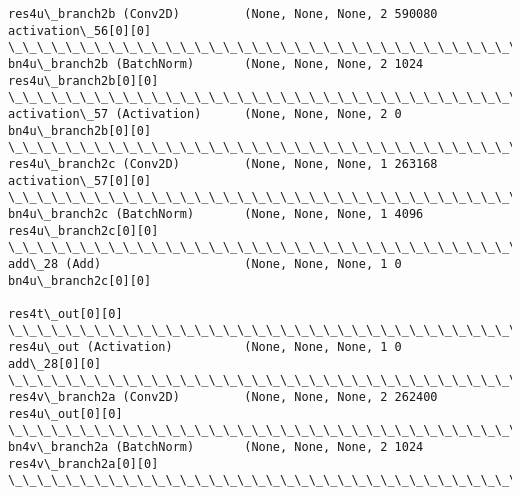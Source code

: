 \documentclass[11pt]{article}
\begin{document}
\begin{Verbatim}[commandchars=\\\{\}]
res4u\_branch2b (Conv2D)         (None, None, None, 2 590080      activation\_56[0][0]              
\_\_\_\_\_\_\_\_\_\_\_\_\_\_\_\_\_\_\_\_\_\_\_\_\_\_\_\_\_\_\_\_\_\_\_\_\_\_\_\_\_\_\_\_\_\_\_\_\_\_\_\_\_\_\_\_\_\_\_\_\_\_\_\_\_\_\_\_\_\_\_\_\_\_\_\_\_\_\_\_\_\_\_\_\_\_\_\_\_\_\_\_\_\_\_\_\_\_
bn4u\_branch2b (BatchNorm)       (None, None, None, 2 1024        res4u\_branch2b[0][0]             
\_\_\_\_\_\_\_\_\_\_\_\_\_\_\_\_\_\_\_\_\_\_\_\_\_\_\_\_\_\_\_\_\_\_\_\_\_\_\_\_\_\_\_\_\_\_\_\_\_\_\_\_\_\_\_\_\_\_\_\_\_\_\_\_\_\_\_\_\_\_\_\_\_\_\_\_\_\_\_\_\_\_\_\_\_\_\_\_\_\_\_\_\_\_\_\_\_\_
activation\_57 (Activation)      (None, None, None, 2 0           bn4u\_branch2b[0][0]              
\_\_\_\_\_\_\_\_\_\_\_\_\_\_\_\_\_\_\_\_\_\_\_\_\_\_\_\_\_\_\_\_\_\_\_\_\_\_\_\_\_\_\_\_\_\_\_\_\_\_\_\_\_\_\_\_\_\_\_\_\_\_\_\_\_\_\_\_\_\_\_\_\_\_\_\_\_\_\_\_\_\_\_\_\_\_\_\_\_\_\_\_\_\_\_\_\_\_
res4u\_branch2c (Conv2D)         (None, None, None, 1 263168      activation\_57[0][0]              
\_\_\_\_\_\_\_\_\_\_\_\_\_\_\_\_\_\_\_\_\_\_\_\_\_\_\_\_\_\_\_\_\_\_\_\_\_\_\_\_\_\_\_\_\_\_\_\_\_\_\_\_\_\_\_\_\_\_\_\_\_\_\_\_\_\_\_\_\_\_\_\_\_\_\_\_\_\_\_\_\_\_\_\_\_\_\_\_\_\_\_\_\_\_\_\_\_\_
bn4u\_branch2c (BatchNorm)       (None, None, None, 1 4096        res4u\_branch2c[0][0]             
\_\_\_\_\_\_\_\_\_\_\_\_\_\_\_\_\_\_\_\_\_\_\_\_\_\_\_\_\_\_\_\_\_\_\_\_\_\_\_\_\_\_\_\_\_\_\_\_\_\_\_\_\_\_\_\_\_\_\_\_\_\_\_\_\_\_\_\_\_\_\_\_\_\_\_\_\_\_\_\_\_\_\_\_\_\_\_\_\_\_\_\_\_\_\_\_\_\_
add\_28 (Add)                    (None, None, None, 1 0           bn4u\_branch2c[0][0]              
                                                                 res4t\_out[0][0]                  
\_\_\_\_\_\_\_\_\_\_\_\_\_\_\_\_\_\_\_\_\_\_\_\_\_\_\_\_\_\_\_\_\_\_\_\_\_\_\_\_\_\_\_\_\_\_\_\_\_\_\_\_\_\_\_\_\_\_\_\_\_\_\_\_\_\_\_\_\_\_\_\_\_\_\_\_\_\_\_\_\_\_\_\_\_\_\_\_\_\_\_\_\_\_\_\_\_\_
res4u\_out (Activation)          (None, None, None, 1 0           add\_28[0][0]                     
\_\_\_\_\_\_\_\_\_\_\_\_\_\_\_\_\_\_\_\_\_\_\_\_\_\_\_\_\_\_\_\_\_\_\_\_\_\_\_\_\_\_\_\_\_\_\_\_\_\_\_\_\_\_\_\_\_\_\_\_\_\_\_\_\_\_\_\_\_\_\_\_\_\_\_\_\_\_\_\_\_\_\_\_\_\_\_\_\_\_\_\_\_\_\_\_\_\_
res4v\_branch2a (Conv2D)         (None, None, None, 2 262400      res4u\_out[0][0]                  
\_\_\_\_\_\_\_\_\_\_\_\_\_\_\_\_\_\_\_\_\_\_\_\_\_\_\_\_\_\_\_\_\_\_\_\_\_\_\_\_\_\_\_\_\_\_\_\_\_\_\_\_\_\_\_\_\_\_\_\_\_\_\_\_\_\_\_\_\_\_\_\_\_\_\_\_\_\_\_\_\_\_\_\_\_\_\_\_\_\_\_\_\_\_\_\_\_\_
bn4v\_branch2a (BatchNorm)       (None, None, None, 2 1024        res4v\_branch2a[0][0]             
\_\_\_\_\_\_\_\_\_\_\_\_\_\_\_\_\_\_\_\_\_\_\_\_\_\_\_\_\_\_\_\_\_\_\_\_\_\_\_\_\_\_\_\_\_\_\_\_\_\_\_\_\_\_\_\_\_\_\_\_\_\_\_\_\_\_\_\_\_\_\_\_\_\_\_\_\_\_\_\_\_\_\_\_\_\_\_\_\_\_\_\_\_\_\_\_\_\_

\end{Verbatim}
\end{document}
